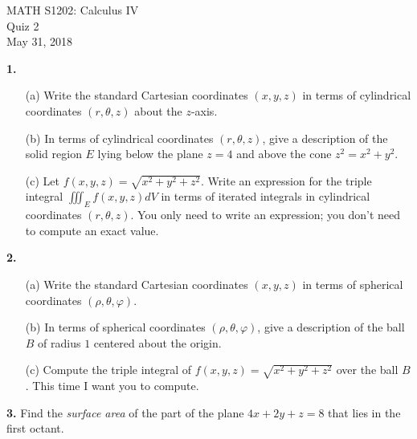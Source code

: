 \documentclass{article}
\begin{document}
\begin{center}
MATH S1202: Calculus IV \\ 
Quiz 2 \\
May 31, 2018
\end{center}


\noindent \textbf{1.} 
\begin{enumerate}
\item[(a)] Write the standard Cartesian coordinates $(x,y,z)$ in terms of cylindrical coordinates $(r, \theta, z)$ about the $z$-axis.
\item[(b)] In terms of cylindrical coordinates $(r, \theta, z)$, give a description of the solid region $E$ lying below the plane $z = 4$ and above the cone $z^2 = x^2 + y^2$. 
\item[(c)] Let $f(x,y,z) = \sqrt{x^2 + y^2 + z^2}$. Write an expression for the triple integral $\iiint_E f(x,y,z) dV$ in terms of iterated integrals in cylindrical coordinates $(r, \theta, z)$. You only need to write an expression; you don't need to compute an exact value. \end{enumerate}

\vspace{3mm}

\noindent \textbf{2.} 
\begin{enumerate}
\item[(a)] Write the standard Cartesian coordinates $(x,y,z)$ in terms of spherical coordinates $(\rho, \theta, \varphi)$.  
\item[(b)] In terms of spherical coordinates $(\rho, \theta, \varphi)$, give a description of the ball $B$ of radius $1$ centered about the origin. 
\item[(c)] Compute the triple integral of $f(x,y,z) = \sqrt{x^2 + y^2 + z^2}$ over the ball $B$. This time I want you to compute. 
\end{enumerate}


\vspace{3mm}

\noindent \textbf{3.} Find the \emph{surface area} of the part of the plane $4x + 2y + z = 8$ that lies in the first octant. 
\end{document}

